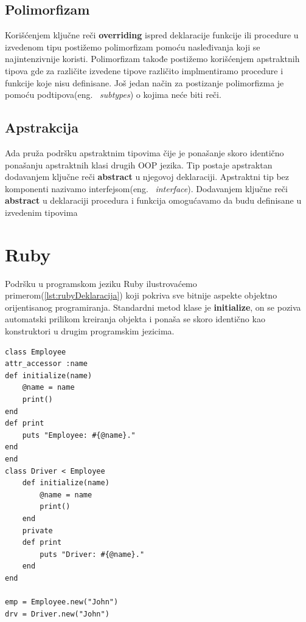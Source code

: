 \documentclass[a4paper]{article}
\begin{document}
{\subsection{Polimorfizam}
\label{subsec:adaPolimorfizam}
Korišćenjem ključne reči \textbf{overriding} ispred deklaracije funkcije ili procedure u izvedenom tipu postižemo polimorfizam pomoću nasleđivanja koji se najintenzivnije koristi. Polimorfizam takođe postižemo korišćenjem apstraktnih tipova gde za različite izvedene tipove različito implmentiramo procedure i funkcije koje nisu definisane. Još jedan način za postizanje polimorfizma je pomoću podtipova(eng. ~{\em subtypes}) o kojima neće biti reči.

\subsection{Apstrakcija}
\label{subsec:adaApstrakcija}
Ada pruža podršku apstraktnim tipovima čije je ponašanje skoro identično ponašanju apstraktnih klasi drugih OOP jezika. Tip postaje apstraktan dodavanjem ključne reči \textbf{abstract} u njegovoj deklaraciji.  Apstraktni tip bez komponenti nazivamo interfejsom(eng. ~{\em interface}). Dodavanjem ključne reči \textbf{abstract} u deklaraciji procedura i funkcija omogućavamo da budu definisane u izvedenim tipovima

\section{Ruby}
\label{sec:ruby}
 Podršku u programskom jeziku Ruby ilustrovaćemo primerom(\ref{lst:rubyDeklaracija}) koji pokriva sve bitnije aspekte objektno orijentisanog programiranja. Standardni metod klase je \textbf{initialize}, on se poziva automatski prilikom kreiranja objekta i ponaša se skoro identično kao konstruktori u drugim programskim jezicima\cite{oopRuby}.

\begin{lstlisting}[caption={Primer objektno orijentisanog programiranja u jeziku Ruby.},frame=single, label=lst:rubyDeklaracija]
class Employee
attr_accessor :name
def initialize(name)
	@name = name
	print()
end
def print
	puts "Employee: #{@name}."
end
end
class Driver < Employee
	def initialize(name)
		@name = name
		print()
	end
	private
	def print
		puts "Driver: #{@name}."
	end
end

emp = Employee.new("John")
drv = Driver.new("John")
\end{lstlisting}

}
\end{document}
